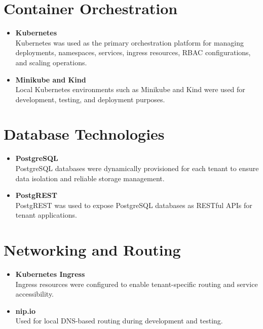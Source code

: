 \documentclass[12pt,a4paper]{report}
\begin{document}
\section{Container Orchestration}

\begin{itemize}

    \item \textbf{Kubernetes} \\
    Kubernetes was used as the primary orchestration platform for managing deployments, namespaces, services, ingress resources, RBAC configurations, and scaling operations.

    \item \textbf{Minikube and Kind} \\
    Local Kubernetes environments such as Minikube and Kind were used for development, testing, and deployment purposes.

\end{itemize}

\section{Database Technologies}

\begin{itemize}

    \item \textbf{PostgreSQL} \\
    PostgreSQL databases were dynamically provisioned for each tenant to ensure data isolation and reliable storage management.

    \item \textbf{PostgREST} \\
    PostgREST was used to expose PostgreSQL databases as RESTful APIs for tenant applications.

\end{itemize}

\section{Networking and Routing}

\begin{itemize}

    \item \textbf{Kubernetes Ingress} \\
    Ingress resources were configured to enable tenant-specific routing and service accessibility.

    \item \textbf{nip.io} \\
    Used for local DNS-based routing during development and testing.

\end{itemize}
\end{document}
